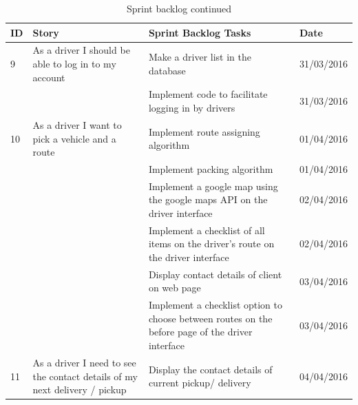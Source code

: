 \documentclass[paper=a4, fontsize=11pt]{scrartcl} %
\numberwithin{equation}{section} %
\numberwithin{figure}{section} %
\numberwithin{table}{section} %
\begin{document}
\begin{table}[!hbt]
\centering
\caption{Sprint backlog continued}

\begin{tabular}{|p{1cm}|p{5cm}|p{5cm}|p{2cm}|}
\hline
\textbf{ID} & \textbf{Story}                                                             & \textbf{Sprint Backlog Tasks}                                                                    & \textbf{Date} \\ \hline
9           & As a driver I should be able to log in to my account                       & Make a driver list in the database                                                               & 31/03/2016    \\ \hline
            &                                                                            & Implement code to facilitate logging in by drivers                                               & 31/03/2016    \\ \hline
10          & As a driver I want to pick a vehicle and a route                           & Implement route assigning algorithm                                                              & 01/04/2016    \\ \hline
            &                                                                            & Implement packing algorithm                                                                      & 01/04/2016    \\ \hline
            &                                                                            & Implement a google map using the google maps API on the driver interface                         & 02/04/2016    \\ \hline
            &                                                                            & Implement a checklist of all items on  the driver's route on the driver interface                & 02/04/2016    \\ \hline
            &                                                                            & Display contact details of client on web page                                                    & 03/04/2016    \\ \hline
            &                                                                            & Implement a checklist option to choose between routes on the before page of the driver interface & 03/04/2016    \\ \hline
11          & As a driver I need to see the contact details of my next delivery / pickup & Display the contact details of current pickup/ delivery                                          & 04/04/2016    \\ \hline

\end{tabular}
\end{table}
\end{document}
